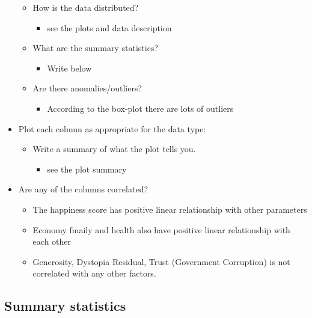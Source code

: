 \documentclass[11pt]{article}
\providecommand{\tightlist}{%
      \setlength{\itemsep}{0pt}\setlength{\parskip}{0pt}}
\begin{document}
\begin{itemize}
  \begin{itemize}
  \tightlist
  \item
    How is the data distributed?

    \begin{itemize}
    \tightlist
    \item
      see the plots and data description
    \end{itemize}
  \item
    What are the summary statistics?

    \begin{itemize}
    \tightlist
    \item
      Write below
    \end{itemize}
  \item
    Are there anomalies/outliers?

    \begin{itemize}
    \tightlist
    \item
      According to the box-plot there are lots of outliers
    \end{itemize}
  \end{itemize}
\item
  Plot each colmun as appropriate for the data type:

  \begin{itemize}
  \tightlist
  \item
    Write a summary of what the plot tells you.

    \begin{itemize}
    \tightlist
    \item
      see the plot summary
    \end{itemize}
  \end{itemize}
\item
  Are any of the columns correlated?

  \begin{itemize}
  \tightlist
  \item
    The happiness score has positive linear relationship with other
    parameters
  \item
    Economy fmaily and health also have positive linear relationship
    with each other
  \item
    Generosity, Dystopia Residual, Trust (Government Corruption) is not
    correlated with any other factors.
  \end{itemize}
\end{itemize}

    \subsection{Summary statistics}\label{summary-statistics}
\end{document}
